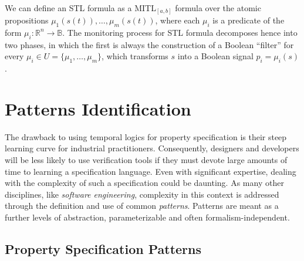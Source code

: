 \paragraph{} We can define an STL formula as a MITL$_{[a,b]}$ formula over the atomic propositions $\mu_1(s(t)),\dots,\mu_m(s(t))$, where each $\mu_i$ is a predicate of the form $\mu_i:\mathbb{R}^n\rightarrow\mathbb{B}$. The monitoring process for STL formula decomposes hence into two phases, in which the first is always the construction of a Boolean “filter” for every $\mu_i \in U = \{\mu_1 , \dots ,\mu_m \}$, which transforms $s$ into a Boolean signal $p_i = \mu_i(s)$.


\section{Patterns Identification}

The drawback to using temporal logics for property specification is their steep learning curve for industrial practitioners. Consequently, designers and developers will be less likely to use verification tools if they must devote large amounts of time to learning a specification language. Even with significant expertise, dealing with the complexity of such a specification could be daunting. As many other disciplines, like \textit{software engineering}, complexity in this context is addressed through the definition and use of common \textit{patterns}. Patterns are meant as a further levels of abstraction, parameterizable and often formalism-independent. 

\subsection{Property Specification Patterns}

